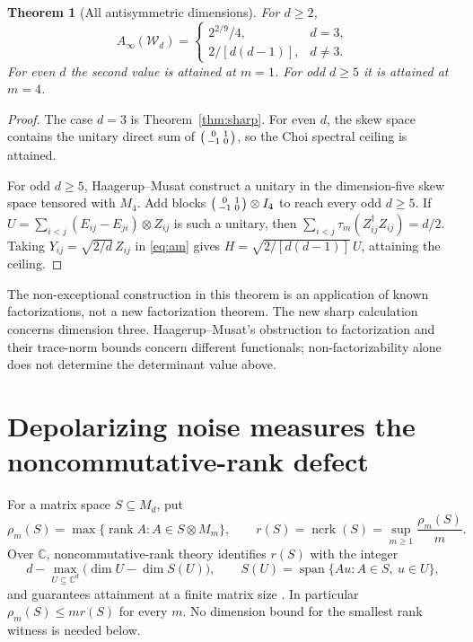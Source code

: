 \documentclass[11pt,a4paper]{article}
\newtheorem{theorem}{Theorem}
\theoremstyle{remark}\newtheorem{remark}[theorem]{Remark}
\newcommand{\rank}{\operatorname{rank}}
\newcommand{\ncrk}{\operatorname{ncrk}}
\newcommand{\Span}{\operatorname{span}}
\newcommand{\W}{\mathcal W}
\newcommand{\M}{M}
\newcommand{\Ainf}{A_\infty}
\begin{document}
\begin{theorem}[All antisymmetric dimensions]\label{thm:all}
For \(d\ge2\),
\[
 \Ainf(\W_d)=
 \begin{cases}
 2^{2/9}/4,&d=3,\\
 2/[d(d-1)],&d\ne3 .
 \end{cases}
\]
For even \(d\) the second value is attained at \(m=1\).
For odd \(d\ge5\) it is attained at \(m=4\).
\end{theorem}
\begin{proof}
The case \(d=3\) is Theorem~\ref{thm:sharp}.
For even \(d\), the skew space contains the unitary direct sum of
\(\begin{psmallmatrix}0&1\\-1&0\end{psmallmatrix}\), so the Choi spectral ceiling is attained.

For odd \(d\ge5\), Haagerup--Musat \cite[Lemma 5.1 and Theorem 5.2(1), equations (5.17)--(5.19)]{HM} construct a unitary in the dimension-five skew space tensored with \(\M_4\). Add blocks \(\begin{psmallmatrix}0&1\\-1&0\end{psmallmatrix}\otimes I_4\) to reach every odd \(d\ge5\). If \(U=\sum_{i<j}(E_{ij}-E_{ji})\otimes Z_{ij}\) is such a unitary, then
\(\sum_{i<j}\tau_m(Z_{ij}^\dagger Z_{ij})=d/2\).
Taking \(Y_{ij}=\sqrt{2/d}\,Z_{ij}\) in \eqref{eq:am} gives
\(H=\sqrt{2/[d(d-1)]}\,U\), attaining the ceiling.
\end{proof}

The non-exceptional construction in this theorem is an application of known factorizations, not a new factorization theorem. The new sharp calculation concerns dimension three. Haagerup--Musat's obstruction to factorization and their trace-norm bounds concern different functionals; non-factorizability alone does not determine the determinant value above.

\section{Depolarizing noise measures the noncommutative-rank defect}
For a matrix space \(S\subseteq\M_d\), put
\[
 \rho_m(S)=\max\{\rank A:A\in S\otimes\M_m\},\qquad
 r(S)=\ncrk(S)=\sup_{m\ge1}\frac{\rho_m(S)}m .
\]
Over \(\mathbb C\), noncommutative-rank theory identifies \(r(S)\) with the integer
\[
 d-\max_{U\subseteq\mathbb C^d}\bigl(\dim U-\dim S(U)\bigr),
 \qquad
 S(U)=\Span\{Au:A\in S,\ u\in U\},
\]
and guarantees attainment at a finite matrix size \cite{DM,IQS}.
In particular \(\rho_m(S)\le mr(S)\) for every \(m\).
No dimension bound for the smallest rank witness is needed below.
\end{document}
